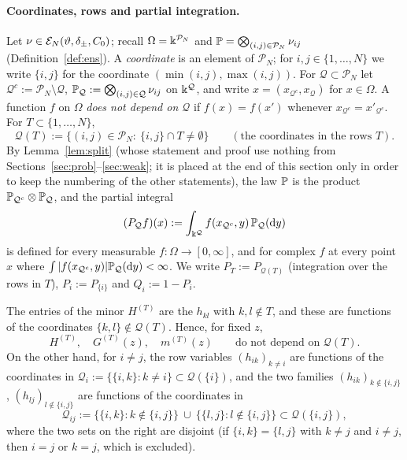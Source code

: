 \paragraph{Coordinates, rows and partial integration.} Let $\nu\in\mathcal E_N(\vartheta,\delta_\pm,C_0)$; recall $\Omega=\Bbbk^{\mathcal P_N}$ and $\mathbb{P}=\bigotimes_{(i,j)\in\mathcal P_N}\nu_{ij}$ (Definition~\ref{def:ens}).
A \emph{coordinate} is an element of $\mathcal P_N$; for $i,j\in\{1,\dots,N\}$ we write $\{i,j\}$ for the coordinate $(\min(i,j),\max(i,j))$. For $\mathcal Q\subset\mathcal P_N$ let $\mathcal Q^c:=\mathcal P_N\setminus\mathcal Q$,
$\mathbb{P}_{\mathcal Q}:=\bigotimes_{(i,j)\in\mathcal Q}\nu_{ij}$ on $\Bbbk^{\mathcal Q}$, and write $x=(x_{\mathcal Q^c},x_{\mathcal Q})$ for $x\in\Omega$.
A function $f$ on $\Omega$ \emph{does not depend on $\mathcal Q$} if $f(x)=f(x')$ whenever $x_{\mathcal Q^c}=x'_{\mathcal Q^c}$. For $T\subset\{1,\dots,N\}$,
\[
 \mathcal Q(T):=\big\{(i,j)\in\mathcal P_N:\ \{i,j\}\cap T\ne\emptyset\big\}\qquad(\text{the coordinates in the rows }T).
\]
By Lemma~\ref{lem:split} (whose statement and proof use nothing from Sections~\ref{sec:prob}--\ref{sec:weak}; it is placed at the end of this section only in order to keep the numbering of the other statements),
the law $\mathbb{P}$ is the product $\mathbb{P}_{\mathcal Q^c}\otimes\mathbb{P}_{\mathcal Q}$, and the partial integral
\[
 (P_{\mathcal Q}f)(x):=\int_{\Bbbk^{\mathcal Q}}f(x_{\mathcal Q^c},y)\,\mathbb{P}_{\mathcal Q}(\mathrm{d} y)
\]
is defined for every measurable $f:\Omega\to[0,\infty]$, and for complex $f$ at every point $x$ where $\int|f(x_{\mathcal Q^c},y)|\mathbb{P}_{\mathcal Q}(\mathrm{d} y)<\infty$. We write
$P_T:=P_{\mathcal Q(T)}$ (integration over the rows in $T$), $P_i:=P_{\{i\}}$ and $Q_i:=1-P_i$.

The entries of the minor $H^{(T)}$ are the $h_{kl}$ with $k,l\notin T$, and these are functions of the coordinates $\{k,l\}\notin\mathcal Q(T)$. Hence, for fixed $z$,
\begin{equation}\tag{R}\label{eq:rowdep}
 H^{(T)},\quad G^{(T)}(z),\quad m^{(T)}(z)\qquad\text{do not depend on }\mathcal Q(T).
\end{equation}
On the other hand, for $i\ne j$, the row variables $(h_{ik})_{k\ne i}$ are functions of the coordinates in $\mathcal Q_i:=\{\{i,k\}:k\ne i\}\subset\mathcal Q(\{i\})$, and the two families $(h_{ik})_{k\notin\{i,j\}}$, $(h_{lj})_{l\notin\{i,j\}}$ are functions of the coordinates in
\[
 \mathcal Q_{ij}:=\big\{\{i,k\}:k\notin\{i,j\}\big\}\ \cup\ \big\{\{l,j\}:l\notin\{i,j\}\big\}\subset\mathcal Q(\{i,j\}),
\]
where the two sets on the right are disjoint (if $\{i,k\}=\{l,j\}$ with $k\ne j$ and $i\ne j$, then $i=j$ or $k=j$, which is excluded).

